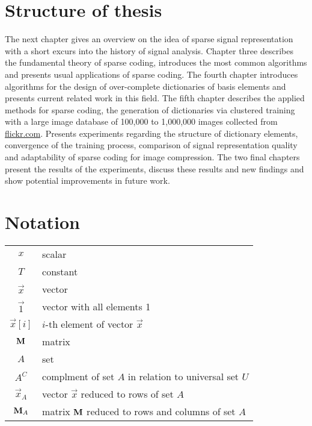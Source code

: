 \section{Structure of thesis}
The next chapter gives an overview on the idea of sparse signal
representation with a short excurs into the history of signal analysis.
Chapter three describes the fundamental theory of sparse coding, introduces the
most common algorithms and presents usual applications of sparse coding. The
fourth chapter introduces algorithms for the design of over-complete
dictionaries of basis elements and presents current related work in this field.
The fifth chapter describes the applied methods for sparse
coding, the generation of dictionaries via clustered training with a large image
database of 100,000 to 1,000,000 images collected from \url{flickr.com}.
Presents experiments regarding the structure of dictionary elements, convergence
of the training process, comparison of signal representation quality and
adaptability of sparse coding for image compression. The two final chapters
present the results of the experiments, discuss these results and new findings
and show potential improvements in future work. 

\section*{Notation}
\begin{tabular}{c l}
$x$ & scalar\\
$T$ & constant\\
$\vec{x}$ & vector\\
$\vec{1}$ & vector with all elements 1\\
$\vec{x}[i]$ & $i$-th element of vector $\vec{x}$\\
$\boldsymbol{\mathrm{M}}$ & matrix\\
$A$ & set\\
$A^C$ & complment of set $A$ in relation to universal set $U$\\ 
$\vec{x}_A$ & vector $\vec{x}$ reduced to rows of set $A$ \\
$\boldsymbol{\mathrm{M}}_A$ & matrix $\boldsymbol{\mathrm{M}}$ reduced to rows and columns of set $A$ \\

\end{tabular}




